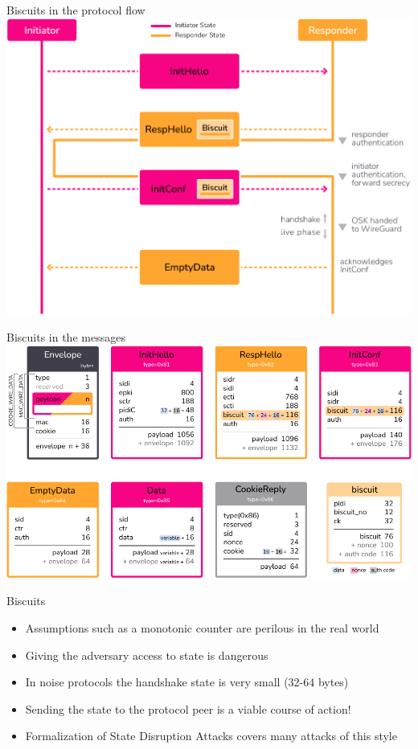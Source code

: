 \begin{frame}{Biscuits in the protocol flow}
  \includegraphics[height=.80\textheight]{graphics/rosenpass-wp-key-exchange-protocol-rgb.pdf}
\end{frame}

\begin{frame}{Biscuits in the messages}
  \includegraphics[height=.80\textheight]{graphics/rosenpass-wp-message-types-rgb.pdf}
\end{frame}

\begin{frame}{Biscuits}
  \begin{itemize}
    \item Assumptions such as a monotonic counter are perilous in the real world
    \item Giving the adversary access to state is dangerous
    \item In noise protocols the handshake state is very small (32-64 bytes)
    \item Sending the state to the protocol peer is a viable course of action!
    \item Formalization of State Disruption Attacks covers many attacks of this style
  \end{itemize}
\end{frame}

